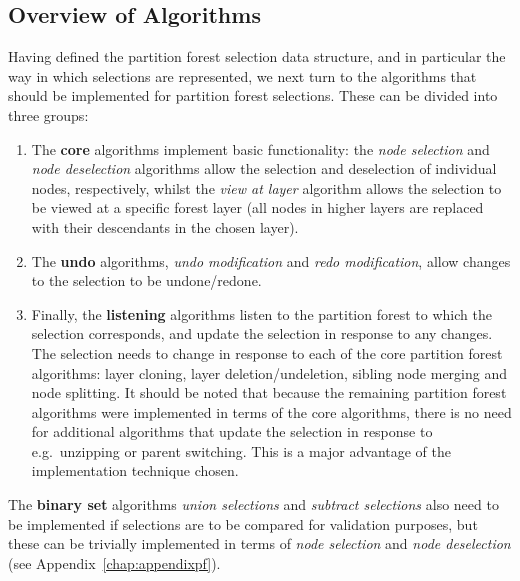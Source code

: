 \subsection{Overview of Algorithms}

Having defined the partition forest selection data structure, and in particular the way in which selections are represented, we next turn to the algorithms that should be implemented for partition forest selections. These can be divided into three groups:

\begin{enumerate}

\item The \textbf{core} algorithms implement basic functionality: the \emph{node selection} and \emph{node deselection} algorithms allow the selection and deselection of individual nodes, respectively, whilst the \emph{view at layer} algorithm allows the selection to be viewed at a specific forest layer (all nodes in higher layers are replaced with their descendants in the chosen layer).

\item The \textbf{undo} algorithms, \emph{undo modification} and \emph{redo modification}, allow changes to the selection to be undone/redone.

\item Finally, the \textbf{listening} algorithms listen to the partition forest to which the selection corresponds, and update the selection in response to any changes. The selection needs to change in response to each of the core partition forest algorithms: layer cloning, layer deletion/undeletion, sibling node merging and node splitting. It should be noted that because the remaining partition forest algorithms were implemented in terms of the core algorithms, there is no need for additional algorithms that update the selection in response to e.g.~unzipping or parent switching. This is a major advantage of the implementation technique chosen.

\end{enumerate}

\noindent The \textbf{binary set} algorithms \emph{union selections} and \emph{subtract selections} also need to be implemented if selections are to be compared for validation purposes, but these can be trivially implemented in terms of \emph{node selection} and \emph{node deselection} (see Appendix~\ref{chap:appendixpf}).

